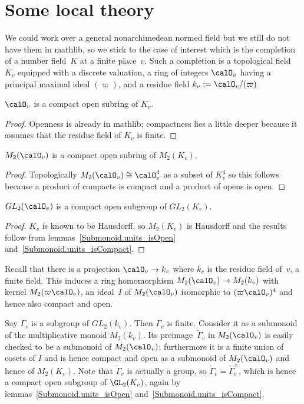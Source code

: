 \section{Some local theory}

We could work over a general nonarchimedean normed field but we still do not have them
in mathlib, so we stick to the case of interest which is the completion of a number
field~$K$ at a finite place~$v$. Such a completion is a topological field~$K_v$
equipped with a discrete valuation, a ring of integers $\calO_v$ having a principal
maximal ideal $(\varpi)$, and a residue field $k_v:=\calO_v/(\varpi)$.

\begin{lemma} $\calO_v$ is a compact open subring of $K_v$.
\end{lemma}
\begin{proof} Openness is already in mathlib; compactness lies a little deeper because it
  assumes that the residue field of $K_v$ is finite.
\end{proof}

\begin{lemma} $M_2(\calO_v)$ is a compact open subring of $M_2(K_v)$.
\end{lemma}
\begin{proof} Topologically $M_2(\calO_v)\cong \calO_v^4$ as a subset of $K_v^4$ so this
  follows because a product of compacts is compact and a product of opens is open.
\end{proof}

\begin{lemma} $GL_2(\calO_v)$ is a compact open subgroup of $GL_2(K_v)$.
\end{lemma}
\begin{proof} $K_v$ is known to be Hausdorff, so $M_2(K_v)$ is Hausdorff and the
  results follow from lemmas~\ref{Submonoid.units_isOpen} and~\ref{Submonoid.units_isCompact}.
\end{proof}

Recall that there is a projection $\calO_v\to k_v$ where $k_v$ is the residue
field of~$v$, a finite field. This induces a ring homomorphism $M_2(\calO_v)\to M_2(k_v)$
with kernel $M_2(\varpi\calO_v)$, an ideal~$I$ of $M_2(\calO_v)$ isomorphic to $(\varpi\calO_v)^4$
and hence also compact and open.

Say $\Gamma_v$ is a subgroup of $GL_2(k_v)$. Then $\Gamma_v$ is finite. Consider it as a submonoid of
the multiplicative monoid $M_2(k_v)$. Its preimage~$\tilde{\Gamma}_v$ in $M_2(\calO_v)$
is easily checked to be a submonoid of $M_2(\calO_v)$; furthermore it is a finite union of
cosets of $I$ and is hence compact and open as a submonoid of $M_2(\calO_v)$ and hence of $M_2(K_v)$.
Note that $\tilde\Gamma_v$ is actually a group, so $\tilde\Gamma_v=\tilde\Gamma_v^\times$, which is
hence a compact open subgroup of $\GL_2(K_v)$, again by lemmas~\ref{Submonoid.units_isOpen}
and~\ref{Submonoid.units_isCompact}.

